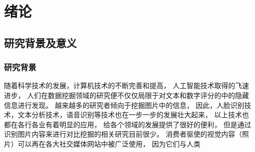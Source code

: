 \documentclass[cs4size,a4paper]{ctexart}
\numberwithin{equation}{section}
\numberwithin{table}{section}
\numberwithin{figure}{section}
\begin{document}
\renewcommand{\contentsname}{\hspace*{\fill}目\quad 录\hspace*{\fill}}
\renewcommand{\abstractname}{摘要}
\renewcommand{\refname}{参考文献}
\renewcommand{\indexname}{索引}
\renewcommand\thefigure{\thesection-\arabic{figure}}
\renewcommand{\figurename}{图}
\renewcommand\thetable{\thesection-\arabic{table}}
\renewcommand{\tablename}{表}
\renewcommand{\appendixname}{附录}
\renewcommand{\proofname}{证明}
\renewcommand{\algorithm}{算法}


\pagestyle{plain}          %


\renewcommand{\cftdot}{.}

\tableofcontents
\newpage

\pagestyle{plain}



\section{绪论}

\subsection{研究背景及意义}

\subsubsection{研究背景}

随着科学技术的发展，计算机技术的不断完善和提高，
人工智能技术取得的飞速进步，
人们在数据挖掘领域的研究便不仅仅局限于对文本和数字评分的中的隐藏信息进行发现。
越来越多的研究者倾向于挖掘图片中的信息，
因此，人脸识别技术，文本分析技术，语音识别等技术也在一步一步的发展壮大起来，
以上技术也都在各行各业有着明显的应用，
给各个领域的发展提供了很好的便利，
但是通过识别图片内容来进行对比挖掘的相关研究目前很少。
消费者驱使的视觉内容（照片）可以再在各大社交媒体网站中被广泛使用，
因为它们与人类
\end{document}

